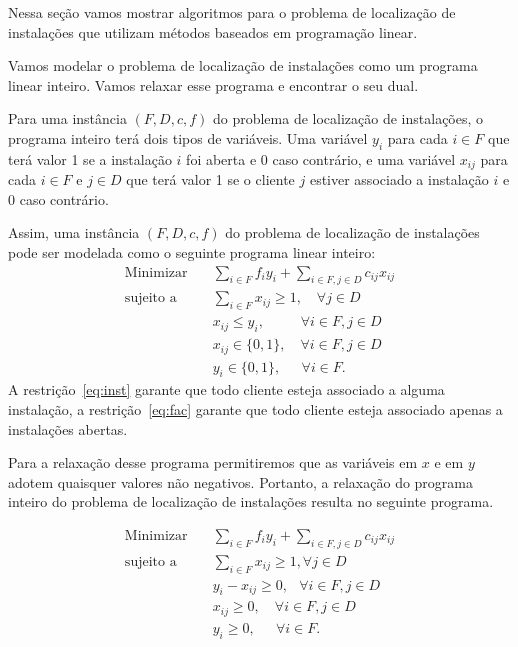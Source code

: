 Nessa seção vamos mostrar algoritmos para o problema de localização de instalações que utilizam métodos baseados em programação linear.

Vamos modelar o problema de localização de instalações como um programa linear inteiro. Vamos relaxar esse programa e encontrar o seu dual.

Para uma instância $(F,D,c,f)$ do problema de localização de instalações, o programa inteiro terá dois tipos de variáveis. Uma variável $y_i$ para cada $i \in F$ que terá valor 1 se a instalação $i$ foi aberta e 0 caso contrário, e uma variável $x_{ij}$ para cada $i \in F$ e $j \in D$ que terá valor 1 se o cliente $j$ estiver associado a instalação $i$ e 0 caso contrário. 

Assim, uma instância $(F,D,c,f)$ do problema de localização de instalações pode ser modelada como o seguinte programa linear inteiro:
\begin{align}
 \text{Minimizar} \quad & \sum_{i \in F}f_iy_i + \sum_{i\in F,j\in D}c_{ij}x_{ij} \nonumber \\
 \text{sujeito a} \quad & \sum_{i\in F} x_{ij}\geq1, \quad \forall j \in D \label{eq:inst}\\
 &x_{ij} \leq y_i,\quad \quad \; \; \forall i\in F,j\in D \label{eq:fac} \\
 &x_{ij} \in \{0,1\} ,\quad \forall i\in F,j\in D \label{fl:x}\\
 &y_i \in \{0,1\}, \quad \; \,\forall i\in F \label{fl:y}.
\end{align}
A restrição~\eqref{eq:inst} garante que todo cliente esteja associado a alguma instalação, a restrição~\eqref{eq:fac} garante que todo cliente esteja associado apenas a instalações abertas.

Para a relaxação desse programa permitiremos que as variáveis em $x$ e em $y$ adotem quaisquer valores não negativos. Portanto, a relaxação do programa inteiro do problema de localização de instalações resulta no seguinte programa.

    \begin{align}
        \text{Minimizar} \quad & \sum_{i \in F}f_iy_i + \sum_{i\in F,j\in D}c_{ij}x_{ij} \tag{P1} \label{P1}\\
        \text{sujeito a} \quad & \sum_{i\in F} x_{ij}\geq1,  \forall j \in D \tag{P2} \label{P2}\\
        &y_i - x_{ij} \geq 0, \, \; \; \forall i\in F,j\in D \tag{P3} \label{P3}\\
        &x_{ij} \geq 0,\quad \forall i\in F,j\in D\tag{P4}\label{P4}\\
        &y_i \geq 0, \quad \; \,\forall i\in F. \tag{P5} \label{P5}
       \end{align}

